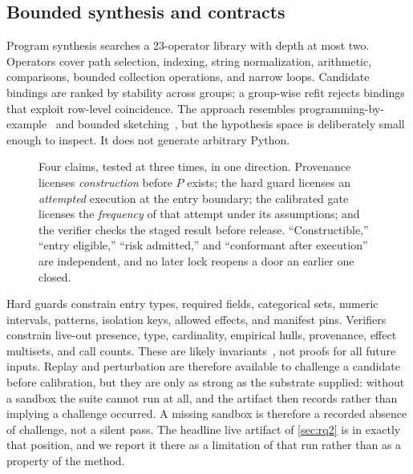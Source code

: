 \subsection{Bounded synthesis and contracts}

Program synthesis searches a 23-operator library with depth at most two.  Operators
cover path selection, indexing, string normalization, arithmetic, comparisons, bounded
collection operations, and narrow loops.  Candidate bindings are ranked by stability
across groups; a group-wise refit rejects bindings that exploit row-level coincidence.
The approach resembles programming-by-example~\cite{gulwani2011flashfill} and bounded
sketching~\cite{solarlezama2006sketching}, but the hypothesis space is deliberately small
enough to inspect.  It does not generate arbitrary Python.

\begin{figure}[t]
  \centering
  
  \caption{Four claims, tested at three times, in one direction.  Provenance licenses
  \emph{construction} before $P$ exists; the hard guard licenses an \emph{attempted}
  execution at the entry boundary; the calibrated gate licenses the \emph{frequency} of
  that attempt under its assumptions; and the verifier checks the staged result before
  release.  ``Constructible,'' ``entry eligible,'' ``risk admitted,'' and ``conformant
  after execution'' are independent, and no later lock reopens a door an earlier one
  closed.}
  \label{fig:locks}
\end{figure}

Hard guards constrain entry types, required fields, categorical sets, numeric intervals,
patterns, isolation keys, allowed effects, and manifest pins.  Verifiers constrain
live-out presence, type, cardinality, empirical hulls, provenance, effect multisets, and
call counts.  These are likely invariants~\cite{ernst2001daikon}, not proofs for all future
inputs.  Replay and perturbation are therefore available to challenge a candidate before
calibration, but they are only as strong as the substrate supplied: without a sandbox the
suite cannot run at all, and the artifact then records  rather than implying a challenge occurred.  A missing sandbox is therefore a
recorded absence of challenge, not a silent pass.  The headline live artifact of
\cref{sec:rq2} is in exactly that position, and we report it there as a limitation of that
run rather than as a property of the method.

